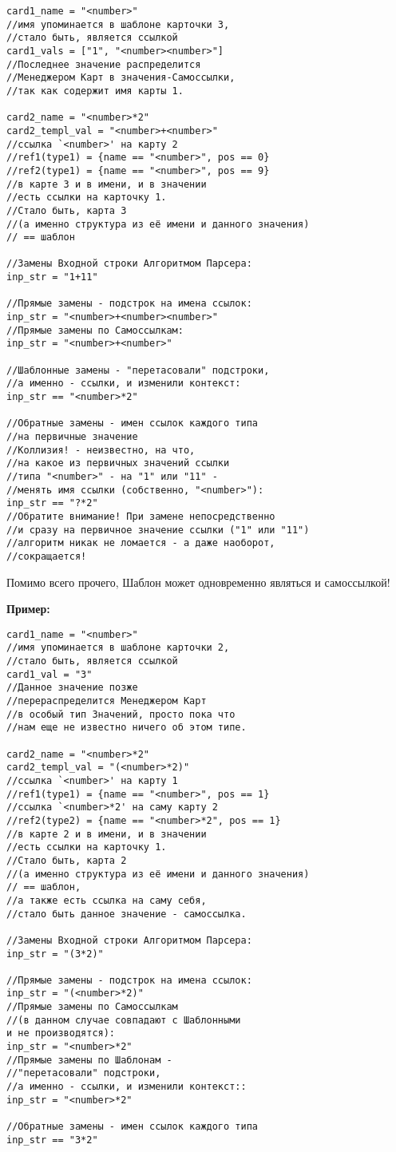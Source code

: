 \documentclass{book}
\begin{document}
\begin{verbatim}
card1_name = "<number>"
//имя упоминается в шаблоне карточки 3, 
//стало быть, является ссылкой
card1_vals = ["1", "<number><number>"]
//Последнее значение распределится 
//Менеджером Карт в значения-Самоссылки,
//так как содержит имя карты 1.

card2_name = "<number>*2"
card2_templ_val = "<number>+<number>"
//ссылка `<number>' на карту 2
//ref1(type1) = {name == "<number>", pos == 0}
//ref2(type1) = {name == "<number>", pos == 9}
//в карте 3 и в имени, и в значении 
//есть ссылки на карточку 1. 
//Стало быть, карта 3 
//(а именно структура из её имени и данного значения)
// == шаблон

//Замены Входной строки Алгоритмом Парсера:
inp_str = "1+11"

//Прямые замены - подстрок на имена ссылок:
inp_str = "<number>+<number><number>"
//Прямые замены по Самоссылкам:
inp_str = "<number>+<number>"

//Шаблонные замены - "перетасовали" подстроки, 
//а именно - ссылки, и изменили контекст:
inp_str == "<number>*2"

//Обратные замены - имен ссылок каждого типа
//на первичные значение
//Коллизия! - неизвестно, на что,
//на какое из первичных значений ссылки
//типа "<number>" - на "1" или "11" -
//менять имя ссылки (собственно, "<number>"):
inp_str == "?*2"
//Обратите внимание! При замене непосредственно
//и сразу на первичное значение ссылки ("1" или "11")
//алгоритм никак не ломается - а даже наоборот,
//сокращается!
\end{verbatim}

Помимо всего прочего, Шаблон может одновременно являться и самоссылкой!

\textbf{Пример:}

\begin{verbatim}
card1_name = "<number>"
//имя упоминается в шаблоне карточки 2, 
//стало быть, является ссылкой
card1_val = "3"
//Данное значение позже
//перераспределится Менеджером Карт
//в особый тип Значений, просто пока что
//нам еще не известно ничего об этом типе.

card2_name = "<number>*2"
card2_templ_val = "(<number>*2)"
//ссылка `<number>' на карту 1
//ref1(type1) = {name == "<number>", pos == 1}
//ссылка `<number>*2' на саму карту 2
//ref2(type2) = {name == "<number>*2", pos == 1}
//в карте 2 и в имени, и в значении 
//есть ссылки на карточку 1. 
//Стало быть, карта 2 
//(а именно структура из её имени и данного значения)
// == шаблон,
//а также есть ссылка на саму себя,
//стало быть данное значение - самоссылка.

//Замены Входной строки Алгоритмом Парсера:
inp_str = "(3*2)"

//Прямые замены - подстрок на имена ссылок:
inp_str = "(<number>*2)"
//Прямые замены по Самоссылкам
//(в данном случае совпадают с Шаблонными 
и не производятся):
inp_str = "<number>*2"
//Прямые замены по Шаблонам - 
//"перетасовали" подстроки, 
//а именно - ссылки, и изменили контекст::
inp_str = "<number>*2"

//Обратные замены - имен ссылок каждого типа
inp_str == "3*2"
\end{verbatim}
\end{document}
